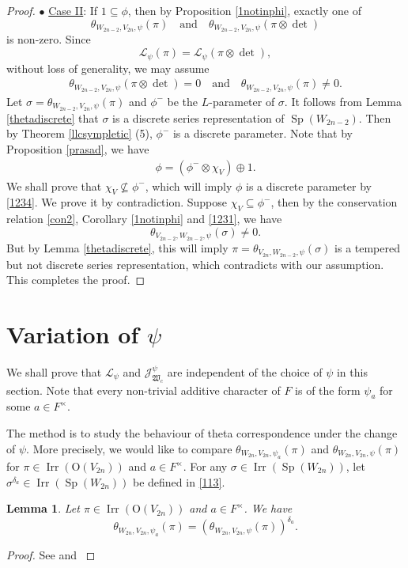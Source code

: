 \documentclass[article]{article}
\numberwithin{equation}{section}
\newtheorem{lemma}[theorem]{Lemma}
\theoremstyle{definition}
\DeclareMathOperator{\SP}{Sp}
\DeclareMathOperator{\Irr}{Irr}
\begin{document}
\begin{proof}
	
$\bullet$ \underline{Case II}: If $\mathrm 1\subseteq \phi$, then by Proposition \ref{1notinphi}, exactly one of  $$\theta_{W_{2n-2},V_{2n},\psi}(\pi)\quad\mbox{and}\quad \theta_{W_{2n-2},V_{2n},\psi}(\pi\otimes\det)$$
is non-zero. Since 
$$
\mathcal L_\psi(\pi)=\mathcal L_\psi(\pi\otimes\det),
$$
without loss of generality, we may assume
\begin{align}\label{1231}
\theta_{W_{2n-2},V_{2n},\psi}(\pi\otimes\det)= 0\quad \mbox{and}\quad \theta_{W_{2n-2},V_{2n},\psi}(\pi)\neq 0.
\end{align} 
Let $\sigma=\theta_{W_{2n-2},V_{2n},\psi}(\pi)$ and $\phi^-$ be the $L$-parameter of $\sigma$. It follows from Lemma \ref{thetadiscrete} that $\sigma$ is a discrete series representation of $\SP(W_{2n-2})$. Then by Theorem \ref{llcsympletic} (5), $\phi^-$ is a discrete  parameter. Note that by Proposition \ref{prasad}, we have
\begin{align}\label{1234}
\phi=(\phi^-\otimes\chi_{V})\oplus \mathrm{1}.
\end{align}
We shall prove that $\chi_{V}\nsubseteq \phi^-$, which will imply $\phi$ is a discrete parameter by \ref{1234}. We prove it by contradiction. Suppose $\chi_{V}\subseteq \phi^-$, then by the conservation relation \ref{con2}, Corollary \ref{1notinphi} and \ref{1231}, we have 
$$\theta_{V_{2n-2},W_{2n-2},\psi} (\sigma)\neq 0.$$
But by Lemma \ref{thetadiscrete}, this will imply $\pi=\theta_{V_{2n},W_{2n-2},\psi} (\sigma)$ is a tempered but not discrete series representation, which contradicts with our assumption. This completes the proof. 
\end{proof}


\section{Variation of $\psi$}\label{changeofpsi}
 We shall prove that $\mathcal L_\psi$ and $\mathcal J^\psi_{\mathfrak W_c}$ are independent of the choice of $\psi$ in this section. Note that every non-trivial additive character of $F$ is of the form $\psi_a$ for some $a\in F^\times$. 
 
 The method is to study the behaviour of theta correspondence under the change of $\psi$. More precisely, we would like to compare $\theta_{W_{2n}, V_{2n}, \psi_a}(\pi)$ and $\theta_{W_{2n},V_{2n},\psi}(\pi)$ for $\pi\in \Irr(\mathrm O(V_{2n}))$ and $a\in F^\times$. For any $\sigma\in \Irr(\SP(W_{2n}))$, let $\sigma^{\delta_a}\in \Irr(\SP(W_{2n}))$ be defined in \ref{113}.   
\begin{lemma}\label{scaling}
	Let $\pi\in \Irr \left(\mathrm O(V_{2n})\right)$ and $a\in F^{\times}$. We have  
	$$
	\theta_{W_{2n}, V_{2n}, \psi_a}(\pi)=
	\left( \theta_{W_{2n},V_{2n},\psi}(\pi)\right)^{\delta_a}. 
	$$
\end{lemma}
\begin{proof}
	See \cite[II Corollary 6.2]{kudla1996notes} and \cite[IV Proposition 1.9]{kudla1996notes}
\end{proof} 
\end{document}
